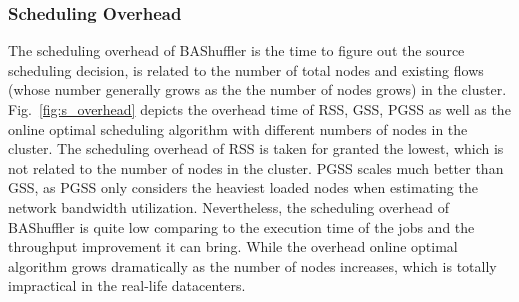 \documentclass[10pt,journal,compsoc]{IEEEtran}
\begin{document}
\subsubsection{Scheduling Overhead}\label{section:eva_overhead}
The scheduling overhead of BAShuffler is the time to figure out the source scheduling decision, is related to the number of total nodes and existing flows (whose number generally grows as the the number of nodes grows) in the cluster. 
Fig.~\ref{fig:s_overhead} depicts the overhead time of RSS, GSS, PGSS as well as the online optimal scheduling algorithm
with different numbers of nodes in the cluster.
The scheduling overhead of RSS is taken for granted the lowest, which is not related to the number of nodes in the cluster. 
PGSS scales much better than GSS, as PGSS only considers the heaviest loaded nodes when estimating the network bandwidth utilization. 
Nevertheless, the scheduling overhead of BAShuffler is quite low comparing to the execution time of the jobs and the throughput improvement it can bring. 
While the overhead online optimal algorithm grows dramatically as the number of nodes increases, which is totally impractical in the real-life datacenters. 



\end{document}
